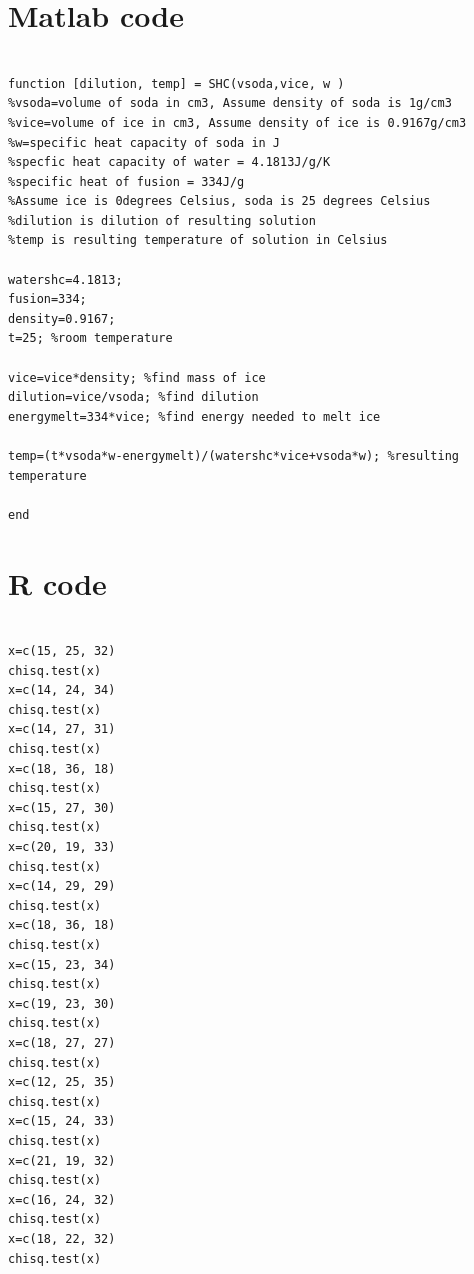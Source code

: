 \documentclass[oneside,12pt]{report}
\begin{document}
\chapter{Matlab code}\label{Matlab code}
\begin{lstlisting}[caption= Matlab code for calculating resulting temperature and dilution, label = matlab]

function [dilution, temp] = SHC(vsoda,vice, w )
%vsoda=volume of soda in cm3, Assume density of soda is 1g/cm3
%vice=volume of ice in cm3, Assume density of ice is 0.9167g/cm3
%w=specific heat capacity of soda in J
%specfic heat capacity of water = 4.1813J/g/K
%specific heat of fusion = 334J/g
%Assume ice is 0degrees Celsius, soda is 25 degrees Celsius
%dilution is dilution of resulting solution
%temp is resulting temperature of solution in Celsius

watershc=4.1813;
fusion=334;
density=0.9167;
t=25; %room temperature

vice=vice*density; %find mass of ice
dilution=vice/vsoda; %find dilution
energymelt=334*vice; %find energy needed to melt ice

temp=(t*vsoda*w-energymelt)/(watershc*vice+vsoda*w); %resulting temperature

end
\end{lstlisting}
\vspace{5pt}

\chapter{R code}\label{R}
\begin{lstlisting}[caption= R code for implementing Pearson's chi-squared test, label = Rcode]

x=c(15, 25, 32)
chisq.test(x)
x=c(14, 24, 34)
chisq.test(x)
x=c(14, 27, 31)
chisq.test(x)
x=c(18, 36, 18)
chisq.test(x)
x=c(15, 27, 30)
chisq.test(x)
x=c(20, 19, 33)
chisq.test(x)
x=c(14, 29, 29)
chisq.test(x)
x=c(18, 36, 18)
chisq.test(x)
x=c(15, 23, 34)
chisq.test(x)
x=c(19, 23, 30)
chisq.test(x)
x=c(18, 27, 27)
chisq.test(x)
x=c(12, 25, 35)
chisq.test(x)
x=c(15, 24, 33)
chisq.test(x)
x=c(21, 19, 32)
chisq.test(x)
x=c(16, 24, 32)
chisq.test(x)
x=c(18, 22, 32)
chisq.test(x)
\end{lstlisting}
\vspace{5pt}



\renewcommand\bibname{Selected Bibliography Including Cited Works}
\nocite{*}  %

\end{document}
